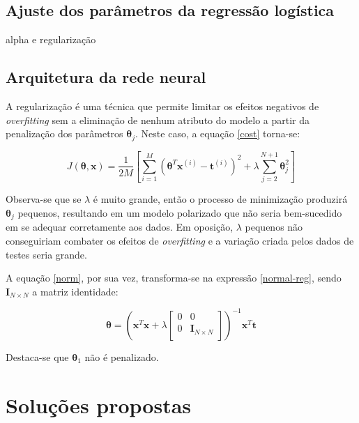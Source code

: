 \documentclass[10pt,twocolumn,letterpaper]{article}
\begin{document}
\subsection{Ajuste dos parâmetros da regressão logística}
\label{sec:ajuste}

alpha e regularização

\subsection {Arquitetura da rede neural}

\label{sec:reg}

A regularização é uma técnica que permite limitar os efeitos negativos de \textit{overfitting} sem a eliminação de nenhum atributo do modelo a partir da penalização dos parâmetros \(\bm{\theta}_j\). Neste caso, a equação \ref{cost} torna-se:

\begin{equation}
\label {cost-reg}
J(\bm{\theta}, \bm{x}) = \frac{1}{2M} \left[\displaystyle\sum_{i=1}^{M} \left(\bm{\theta}^T\bm{x}^{(i)} - \bm{t}^{(i)}\right)^2 + \lambda \displaystyle\sum_{j=2}^{N + 1} \bm{\theta}_j^2 \right]
\end{equation}

Observa-se que se \(\lambda\) é muito grande, então o processo de minimização produzirá \(\bm{\theta}_j\) pequenos, resultando em um modelo polarizado que não seria bem-sucedido em se adequar corretamente aos dados. Em oposição, \(\lambda\) pequenos não conseguiriam combater os efeitos de \textit{overfitting} e a variação criada pelos dados de testes seria grande.

A equação \ref{norm}, por sua vez, transforma-se na expressão \ref{normal-reg}, sendo \(\bm{I}_{N \times N}\) a matriz identidade:

\begin{equation}
\label {normal-reg}
\bm{\theta} = \left(\bm{x}^T\bm{x} + \lambda
\begin{bmatrix}
    0       & 0 \\
    0       & \bm{I}_{N \times N} \\
\end{bmatrix}
\right)^{-1} \bm{x}^T \bm{t}
\end{equation}

Destaca-se que \(\bm{\theta}_1\) não é penalizado.

\section{Soluções propostas}
\end{document}

